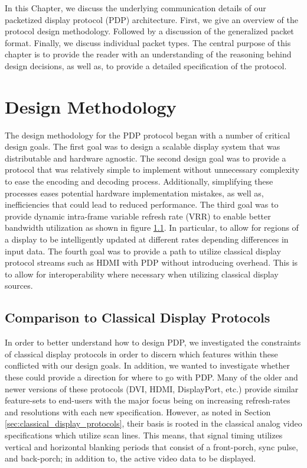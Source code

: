 \label{chap:pdp_protocol}

In this Chapter, we discuss the underlying communication details of our packetized display protocol (PDP) architecture. First, we give an overview of the protocol design methodology. Followed by a discussion of the generalized packet format. Finally, we discuss individual packet types. The central purpose of this chapter is to provide the reader with an understanding of the reasoning behind design decisions, as well as, to provide a detailed specification of the protocol.

\section{Design Methodology}

    The design methodology for the PDP protocol began with a number of critical design goals. The first goal was to design a scalable display system that was distributable and hardware agnostic. The second design goal was to provide a protocol that was relatively simple to implement without unnecessary complexity to ease the encoding and decoding process. Additionally, simplifying these processes eases potential hardware implementation mistakes, as well as, inefficiencies that could lead to reduced performance. The third goal was to provide dynamic intra-frame variable refresh rate (VRR) to enable better bandwidth utilization as shown in figure \ref{}. In particular, to allow for regions of a display to be intelligently updated at different rates depending differences in input data. The fourth goal was to provide a path to utilize classical display protocol streams such as HDMI with PDP without introducing overhead. This is to allow for interoperability where necessary when utilizing classical display sources.

    \subsection{Comparison to Classical Display Protocols}

        In order to better understand how to design PDP, we investigated the constraints of classical display protocols in order to discern which features within these conflicted with our design goals. In addition, we wanted to investigate whether these could provide a direction for where to go with PDP. Many of the older and newer versions of these protocols (DVI\cite{DDWG1999}, HDMI\cite{HDMIForum2018}, DisplayPort\cite{VESA2016}, etc.) provide similar feature-sets to end-users with the major focus being on increasing refresh-rates and resolutions with each new specification. However, as noted in Section \ref{sec:classical_display_protocols}, their basis is rooted in the classical analog video specifications which utilize scan lines\cite{Neal1998}. This means, that signal timing utilizes vertical and horizontal blanking periods that consist of a front-porch, sync pulse, and back-porch; in addition to, the active video data to be displayed.

